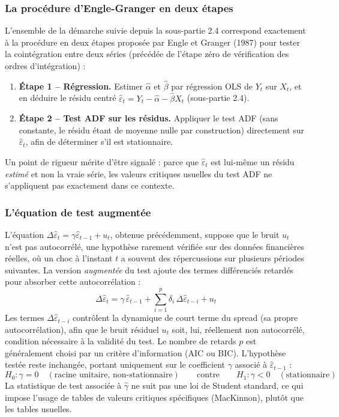 \documentclass{article}
\begin{document}
\subsubsection*{La procédure d'Engle-Granger en deux étapes}
L'ensemble de la démarche suivie depuis la sous-partie 2.4 correspond exactement à la procédure en deux étapes proposée par Engle et Granger (1987) pour tester la cointégration entre deux séries (précédée de l'étape zéro de vérification des ordres d'intégration) :
\begin{enumerate}
\item \textbf{Étape 1 -- Régression.} Estimer $\hat\alpha$ et $\hat\beta$ par régression OLS de $Y_t$ sur $X_t$, et en déduire le résidu centré $\hat\varepsilon_t = Y_t-\hat\alpha-\hat\beta X_t$ (sous-partie 2.4).
\item \textbf{Étape 2 -- Test ADF sur les résidus.} Appliquer le test ADF (sans constante, le résidu étant de moyenne nulle par construction) directement sur $\hat{\varepsilon}_t$, afin de déterminer s'il est stationnaire.
\end{enumerate}
Un point de rigueur mérite d'être signalé : parce que $\hat{\varepsilon}_t$ est lui-même un résidu \emph{estimé} et non la vraie série, les valeurs critiques usuelles du test ADF ne s'appliquent pas exactement dans ce contexte. 
\subsubsection*{L'équation de test augmentée}
L'équation $\Delta \hat{\varepsilon}_t = \gamma \hat{\varepsilon}_{t-1} + u_t$, obtenue précédemment, suppose que le bruit $u_t$ n'est pas autocorrélé, une hypothèse rarement vérifiée sur des données financières réelles, où un choc à l'instant $t$ a souvent des répercussions sur plusieurs périodes suivantes. La version \emph{augmentée} du test ajoute des termes différenciés retardés pour absorber cette autocorrélation :
\begin{equation}
\Delta \hat{\varepsilon}_t = \gamma\, \hat{\varepsilon}_{t-1} + \sum_{i=1}^{p} \delta_i\, \Delta \hat{\varepsilon}_{t-i} + u_t
\end{equation}
Les termes $\Delta \hat{\varepsilon}_{t-i}$ contrôlent la dynamique de court terme du spread (sa propre autocorrélation), afin que le bruit résiduel $u_t$ soit, lui, réellement non autocorrélé, condition nécessaire à la validité du test. Le nombre de retards $p$ est généralement choisi par un critère d'information (AIC ou BIC). L'hypothèse testée reste inchangée, portant uniquement sur le coefficient $\gamma$ associé à $\hat{\varepsilon}_{t-1}$ :
\begin{equation}
H_0 : \gamma = 0 \quad (\text{racine unitaire, non-stationnaire}) \qquad \text{contre} \qquad H_1 : \gamma < 0 \quad (\text{stationnaire})
\end{equation}
La statistique de test associée à $\hat\gamma$ ne suit pas une loi de Student standard, ce qui impose l'usage de tables de valeurs critiques spécifiques (MacKinnon), plutôt que les tables usuelles.
\end{document}
